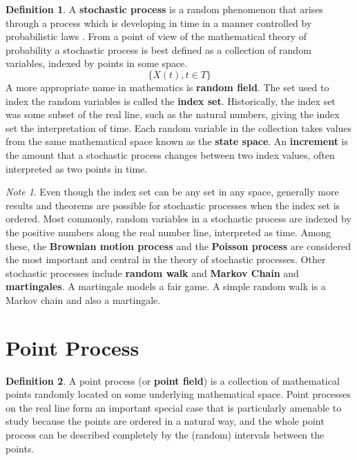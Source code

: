 \documentclass[12pt]{article}
\theoremstyle{plain}
\theoremstyle{definition}
\newtheorem{definition}{Definition}
\theoremstyle{remark}
\newtheorem*{note}{Note}
\begin{document}
\begin{definition}
  A \textbf{stochastic process} is a random phenomenon that arises through a
  process which is developing in time in a manner controlled by probabilistic
  laws \citep{par99}.
  From a point of view of the mathematical theory of probability a stochastic
  process is best defined as a collection of random variables, indexed by points
  in some space.
  \begin{equation*}
    \{X(t), t \in T\}
  \end{equation*}
  A more appropriate name in mathematics is \textbf{random field}.
  The set used to index the random variables is called the \textbf{index set}.
  Historically, the index set was some subset of the real line, such as the
  natural numbers, giving the index set the interpretation of time.
  Each random variable in the collection takes values from the same mathematical
  space known as the \textbf{state space}.
  An \textbf{increment} is the amount that a stochastic process changes between
  two index values, often interpreted as two points in time.
\end{definition}

\begin{note}
  Even though the index set can be any set in any space, generally more results
  and theorems are possible  for stochastic processes when the index set is
  ordered.
  Most commonly, random variables in a stochastic process are indexed by the
  positive numbers along the real number line, interpreted as time.
  Among these, the \textbf{Brownian motion process} and
  the \textbf{Poisson process} are considered the most important and central in
  the theory of stochastic processes.
  Other stochastic processes include \textbf{random walk} and
  \textbf{Markov Chain} and \textbf{martingales}.
  A martingale models a fair game.
  A simple random walk is a Markov chain and also a martingale.
\end{note}

\section{Point Process}

\begin{definition}
  A point process (or \textbf{point field}) is a collection of mathematical
  points randomly located on some underlying mathematical space.
  Point processes on the real line form an important special case that is
  particularly amenable to study because the points are ordered in a natural
  way, and the whole point process can be described completely by the (random)
  intervals between the points.
\end{definition}
\end{document}
